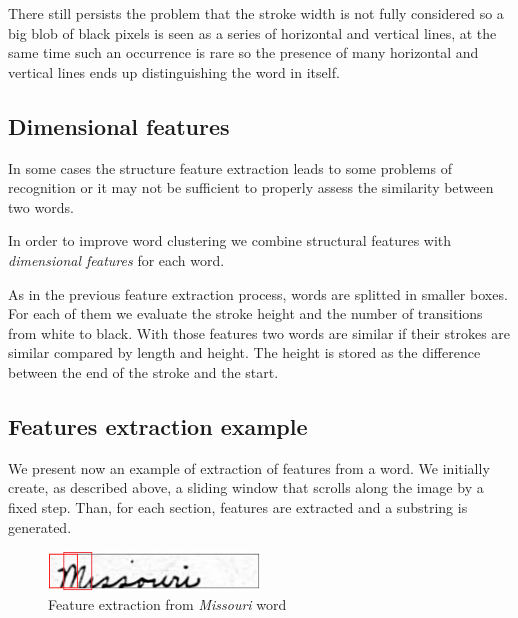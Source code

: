 There still persists the problem that the stroke width is not fully considered so a big blob of black pixels is seen as a series of horizontal and vertical lines, at the same time such an occurrence is rare so the presence of many horizontal and vertical lines ends up distinguishing the word in itself.    

\subsection{Dimensional features}

In some cases the structure feature extraction leads to some problems of recognition or it may not be sufficient to properly assess the similarity between two words.

In order to improve word clustering we combine structural features with \emph{dimensional features} for each word. 

As in the previous feature extraction process, words are splitted in smaller boxes. For each of them we evaluate the stroke height and the number of transitions from white to black. With those features two words are similar if their strokes are similar compared by length and height. The height is stored as the difference between the end of the stroke and the start.

\subsection{Features extraction example}

We present now an example of extraction of features from a word. We initially create, as described above, a sliding window that scrolls along the image by a fixed step. Than, for each section,  features are extracted and a substring is generated.

\begin{figure}[!ht]
\centering
\includegraphics[width=0.5\textwidth]{images/missouri_crop.jpg}
\caption{Feature extraction from \emph{Missouri} word}
\end{figure} 

